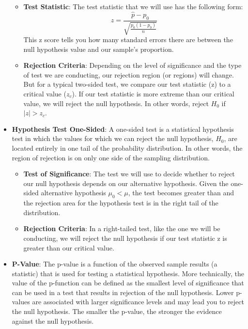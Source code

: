 \documentclass{article}
\begin{document}
\begin{itemize}
\begin{itemize}
\item \textbf{Test Statistic}: The test statistic that we will use has the following form:
\[ z = \frac{\hat{p} - p_0}{\sqrt{\frac{p_0(1-p_0)}{n}}} \]
This z score tells you how many standard errors there are between the null hypothesis value and our sample's proportion.

\item \textbf{Rejection Criteria}:  Depending on the level of significance and the type of test we are conducting, our rejection region (or regions) will change. But for a typical two-sided test, we compare our test statistic (z) to a critical value ($z_c$). If our test statistic is more extreme than our critical value, we will reject the null hypothesis. In other words, reject $H_0$ if $|z| > z_c$.

\end{itemize}

\item \textbf{Hypothesis Test One-Sided}: A one-sided test is a statistical hypothesis test in which the values for which we can reject the null hypothesis, $H_0$, are located entirely in one tail of the probability distribution. In other words, the region of rejection is on only one side of the sampling distribution.

\begin{itemize}

\item \textbf{Test of Significance}: The test we will use to decide whether to reject our null hypothesis depends on our alternative hypothesis. Given the one-sided alternative hypothesis $\mu_0 < \mu $, the test becomes greater than and the rejection area for the hypothesis test is in the right tail of the distribution.

\item \textbf{Rejection Criteria}: In a right-tailed test, like the one we will be conducting, we will reject the null hypothesis if our test statistic z is greater than our critical value.

\end{itemize}

\item \textbf{P-Value}: The p-value is a function of the observed sample results (a statistic) that is used for testing a statistical hypothesis. More technically, the value of the p-function can be defined as the smallest level of significance that can be used in a test that results in rejection of the null hypothesis. Lower p-values are associated with larger significance levels and may lead you to reject the null hypothesis. The smaller the p-value, the stronger the evidence against the null hypothesis.


\end{itemize}
\end{document}
